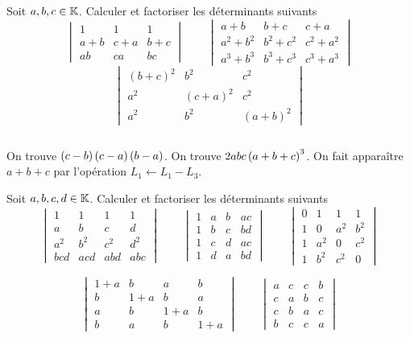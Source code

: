 \documentclass{magnolia}
\begin{document}
Soit $a,b,c\in\mathbb{K}$. Calculer et factoriser les déterminants suivants
\[\begin{vmatrix}
  1 & 1 & 1\\
  a+b & c+a & b+c\\
  ab & ca & bc
  \end{vmatrix}\qquad
  \begin{vmatrix}
  a+b & b+c & c+a\\
  a^2+b^2 & b^2+c^2 & c^2+a^2\\
  a^3+b^3 & b^3+c^3 & c^3+a^3
  \end{vmatrix}\]
\[\begin{vmatrix}
  (b+c)^2 & b^2 & c^2\\
  a^2 & (c+a)^2 & c^2\\
  a^2 & b^2 & (a+b)^2
  \end{vmatrix}\]
\begin{sol}
$\quad$
\begin{questions}
\question On trouve $\left(c-b\right)\left(c-a\right)\left(b-a\right)$.
\question On trouve $2abc\left(a+b+c\right)^3$. On fait apparaître $a+b+c$ par
  l'opération $L_1\gets L_1-L_3$.
\end{questions}
\end{sol}

Soit $a,b,c,d\in\mathbb{K}$. Calculer et factoriser les déterminants suivants
\[\begin{vmatrix}
  1 & 1 & 1 & 1\\
  a & b & c & d\\
  a^2 & b^2 & c^2 & d^2\\
  bcd & acd & abd & abc
  \end{vmatrix}\qquad
  \begin{vmatrix}
  1 & a & b & ac\\
  1 & b & c & bd\\
  1 & c & d & ac\\
  1 & d & a & bd
  \end{vmatrix}
  \qquad
  \begin{vmatrix}
  0 & 1 & 1 & 1\\
  1 & 0 & a^2 & b^2\\
  1 & a^2 & 0 & c^2\\
  1 & b^2 & c^2 & 0
  \end{vmatrix}
  \]

\[\begin{vmatrix}
  1+a & b & a & b\\
  b & 1+a & b & a\\
  a & b & 1+a & b\\
  b & a & b & 1+a
  \end{vmatrix}\qquad
  \begin{vmatrix}
  a & c & c & b\\
  c & a & b & c\\
  c & b & a & c\\
  b & c & c & a
  \end{vmatrix}\]
\end{document}
